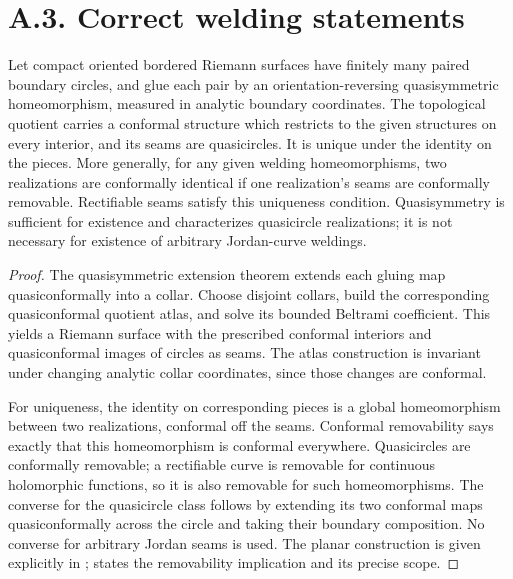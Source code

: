 \section{A.3. Correct welding statements}

\begin{theorem}\label{A:welding}
Let compact oriented bordered Riemann surfaces have finitely many
paired boundary circles, and glue each pair by an orientation-reversing
quasisymmetric homeomorphism, measured in analytic boundary
coordinates. The topological quotient carries a conformal structure
which restricts to the given structures on every interior, and its
seams are quasicircles. It is unique under the identity on the
pieces. More generally, for any given welding homeomorphisms,
two realizations are conformally identical if one realization's
seams are conformally removable. Rectifiable seams satisfy this
uniqueness condition. Quasisymmetry is sufficient for existence
and characterizes quasicircle realizations; it is not necessary
for existence of arbitrary Jordan-curve weldings.
\end{theorem}
\begin{proof}
The quasisymmetric extension theorem extends each gluing map
quasiconformally into a collar. Choose disjoint collars, build the
corresponding quasiconformal quotient atlas, and solve its bounded
Beltrami coefficient. This yields a Riemann surface with the
prescribed conformal interiors and quasiconformal images of circles
as seams. The atlas construction is invariant under changing
analytic collar coordinates, since those changes are conformal.

For uniqueness, the identity on corresponding pieces is a global
homeomorphism between two realizations, conformal off the seams.
Conformal removability says exactly that this homeomorphism is
conformal everywhere. Quasicircles are conformally removable; a
rectifiable curve is removable for continuous holomorphic
functions, so it is also removable for such homeomorphisms.
The converse for the quasicircle class follows by extending its
two conformal maps quasiconformally across the circle and taking
their boundary composition. No converse for arbitrary Jordan
seams is used.
The planar construction is given explicitly in
\citet[Section 2]{Hamilton2002}; \citet[Section 1]{Younsi2018}
states the removability implication and its precise scope.
\end{proof}

